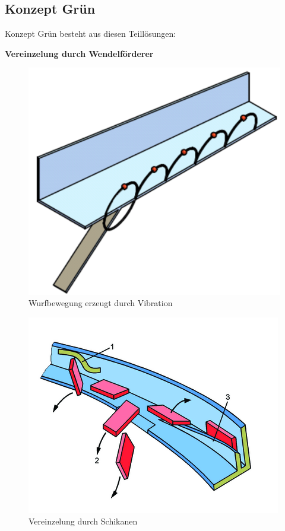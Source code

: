 \subsection{Konzept Grün}
\label{KonzeptGreen}
Konzept Grün besteht aus diesen Teillösungen:
\newline

\textbf{Vereinzelung durch Wendelförderer}
\begin{figure}
	\includegraphics[scale=0.2]{Illustrationen/5-Konzept/foerderbewegung.png}
	\caption{Wurfbewegung erzeugt durch Vibration}
	\label{fig:foerderbewegung}
\end{figure}
\begin{figure}
	\includegraphics[scale=2.0]{Illustrationen/5-Konzept/schikane.png}
	\caption{Vereinzelung durch Schikanen}
	\label{fig:schikane}
\end{figure}
